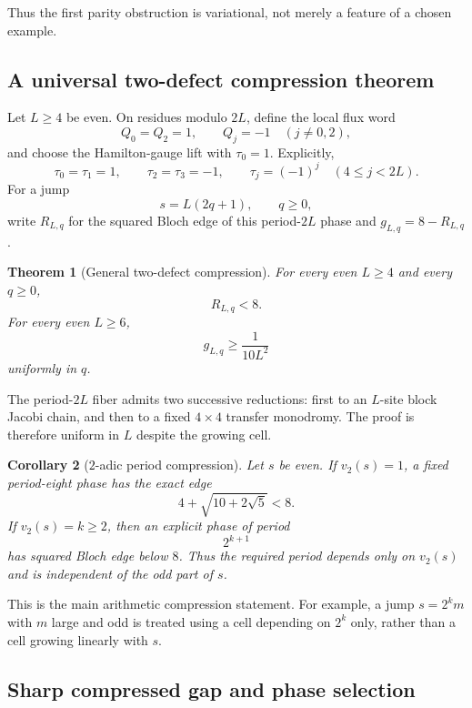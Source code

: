 \documentclass[11pt]{article}
\newtheorem{theorem}{Theorem}[section]
\newtheorem{corollary}[theorem]{Corollary}
\theoremstyle{remark}
\newcommand{\vTwo}{v_2}
\begin{document}
Thus the first parity obstruction is variational, not merely a feature of a
chosen example.

\subsection{A universal two-defect compression theorem}

Let $L\ge4$ be even.  On residues modulo $2L$, define the local flux word
\begin{equation}
 Q_0=Q_2=1,
 \qquad Q_j=-1\quad(j\ne0,2),
 \label{eq:two-defect-Q}
\end{equation}
and choose the Hamilton-gauge lift with $\tau_0=1$.  Explicitly,
\begin{equation}
 \tau_0=\tau_1=1,
 \qquad \tau_2=\tau_3=-1,
 \qquad \tau_j=(-1)^j\quad(4\le j<2L).
 \label{eq:two-defect-tau}
\end{equation}
For a jump
\[
 s=L(2q+1),\qquad q\ge0,
\]
write $R_{L,q}$ for the squared Bloch edge of this period-$2L$ phase and
$g_{L,q}=8-R_{L,q}$.

\begin{theorem}[General two-defect compression]
\label{thm:compression}
For every even $L\ge4$ and every $q\ge0$,
\[
 \boxed{R_{L,q}<8.}
\]
For every even $L\ge6$,
\[
 \boxed{g_{L,q}\ge\frac1{10L^2}}
\]
uniformly in $q$.
\end{theorem}

The period-$2L$ fiber admits two successive reductions: first to an
$L$-site block Jacobi chain, and then to a fixed $4\times4$ transfer
monodromy.  The proof is therefore uniform in $L$ despite the growing cell.

\begin{corollary}[$2$-adic period compression]
\label{cor:2adic}
Let $s$ be even.  If $\vTwo(s)=1$, a fixed period-eight phase has the exact
edge
\[
 \boxed{4+\sqrt{10+2\sqrt5}<8.}
\]
If $\vTwo(s)=k\ge2$, then an explicit phase of period
\[
 \boxed{2^{k+1}}
\]
has squared Bloch edge below $8$.  Thus the required period depends only on
$\vTwo(s)$ and is independent of the odd part of $s$.
\end{corollary}

This is the main arithmetic compression statement.  For example, a jump
$s=2^k m$ with $m$ large and odd is treated using a cell depending on $2^k$
only, rather than a cell growing linearly with $s$.

\subsection{Sharp compressed gap and phase selection}
\end{document}
